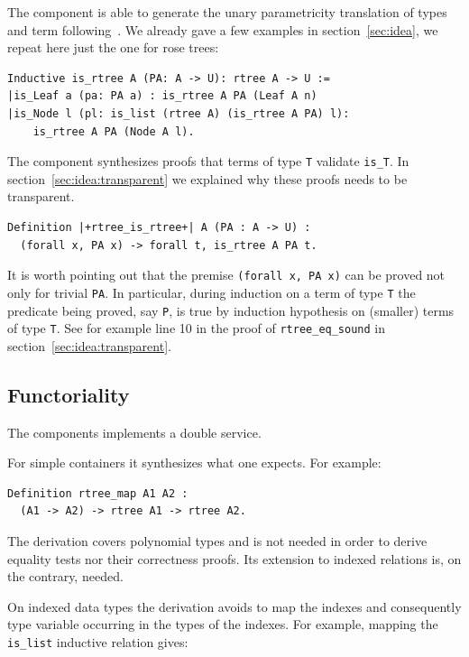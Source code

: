 \documentclass[sigplan,10pt,review]{acmart}\settopmatter{printfolios=true,printccs=false,printacmref=false}
\newcommand{\derive}[1]{\keys{#1}}
\begin{document}
The \derive{pram1} component is able to generate the unary
parametricity translation of types and term
following~\cite{keller:hal-00730913}. We already gave a few
examples in section~\ref{sec:idea}, we repeat here just the
one for rose trees:

\begin{lstlisting}
Inductive is_rtree A (PA: A -> U): rtree A -> U :=
|is_Leaf a (pa: PA a) : is_rtree A PA (Leaf A n)
|is_Node l (pl: is_list (rtree A) (is_rtree A PA) l):
    is_rtree A PA (Node A l).
\end{lstlisting}

\noindent
The \derive{pram1P} component synthesizes proofs that terms
of type \lstinline+T+ validate \lstinline+is_T+.
In section~\ref{sec:idea:transparent} we explained why
these proofs needs to be transparent.

\begin{lstlisting}
Definition |+rtree_is_rtree+| A (PA : A -> U) :
  (forall x, PA x) -> forall t, is_rtree A PA t.
\end{lstlisting}

\noindent
It is worth pointing out that the premise
\lstinline+(forall x, PA x)+ can be proved not only for
trivial \lstinline+PA+. In particular, during induction
on a term of type \lstinline+T+ the predicate being
proved, say \lstinline+P+, is true by induction hypothesis
on (smaller) terms of type \lstinline+T+. See for example
line 10 in the proof of \lstinline+rtree_eq_sound+ in
section~\ref{sec:idea:transparent}.


\subsection{Functoriality} %

The \derive{map} components implements a double service.

For simple containers it synthesizes what one expects. For example:

\begin{lstlisting}
Definition rtree_map A1 A2 :
  (A1 -> A2) -> rtree A1 -> rtree A2.
\end{lstlisting}

The derivation covers polynomial types and is not needed in order
to derive equality tests nor their correctness proofs. Its extension
to indexed relations is, on the contrary, needed.

On indexed data types the derivation avoids to map the indexes and
consequently type variable occurring in the types of the indexes.
For example, mapping the \lstinline+is_list+ inductive relation gives:
\end{document}
